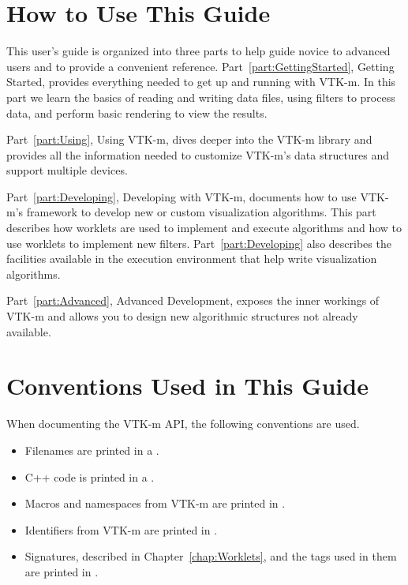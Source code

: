 \section{How to Use This Guide}

This user's guide is organized into three parts to help guide novice to
advanced users and to provide a convenient reference.
Part~\ref{part:GettingStarted}, Getting Started, provides everything needed
to get up and running with VTK-m. In this part we learn the basics of
reading and writing data files, using filters to process data, and perform
basic rendering to view the results.

Part~\ref{part:Using}, Using VTK-m, dives deeper into the VTK-m library and
provides all the information needed to customize VTK-m's data structures
and support multiple devices.

Part~\ref{part:Developing}, Developing with VTK-m, documents how to use
VTK-m's framework to develop new or custom visualization algorithms. This
part describes how worklets are used to implement and execute algorithms
and how to use worklets to implement new filters.
Part~\ref{part:Developing} also describes the facilities available in the
execution environment that help write visualization algorithms.

Part~\ref{part:Advanced}, Advanced Development, exposes the inner workings
of VTK-m and allows you to design new algorithmic structures not already
available. 

\section{Conventions Used in This Guide}

When documenting the VTK-m API, the following conventions are used.
\begin{itemize}
\item Filenames are printed in a .
\item C++ code is printed in a .
\item Macros and namespaces from VTK-m are printed in .
\item Identifiers from VTK-m are printed in .
\item Signatures, described in Chapter~\ref{chap:Worklets}, and the
  tags used in them are printed in .
\end{itemize}

